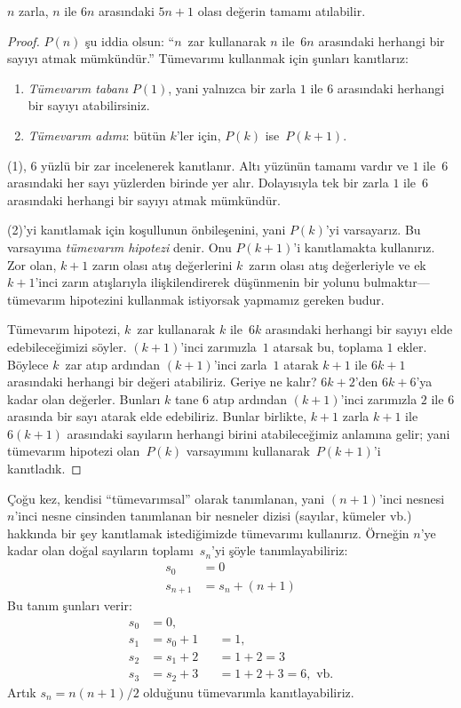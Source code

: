 \begin{thm}
  $n$ zarla, $n$ ile $6n$ arasındaki $5n+1$ olası değerin tamamı
  atılabilir.
\end{thm}

\begin{proof}
$P(n)$ şu iddia olsun: ``$n$~zar kullanarak $n$ ile~$6n$ arasındaki
herhangi bir sayıyı atmak mümkündür.'' Tümevarımı kullanmak için şunları
kanıtlarız:
\begin{enumerate}
\item \emph{Tümevarım tabanı} $P(1)$, yani yalnızca bir zarla $1$ ile
  $6$ arasındaki herhangi bir sayıyı atabilirsiniz.
\item \emph{Tümevarım adımı}: bütün $k$'ler için, $P(k)$ ise~$P(k+1)$.
\end{enumerate}

(1), $6$ yüzlü bir zar incelenerek kanıtlanır. Altı yüzünün tamamı
vardır ve $1$ ile~$6$ arasındaki her sayı yüzlerden birinde yer alır.
Dolayısıyla tek bir zarla $1$ ile~$6$ arasındaki herhangi bir sayıyı
atmak mümkündür.

(2)'yi kanıtlamak için koşullunun önbileşenini, yani $P(k)$'yi
varsayarız. Bu varsayıma \emph{tümevarım hipotezi} denir. Onu $P(k+1)$'i
kanıtlamakta kullanırız. Zor olan, $k+1$ zarın olası atış değerlerini
  $k$~zarın olası atış değerleriyle ve ek $k+1$'inci zarın atışlarıyla
ilişkilendirerek düşünmenin bir yolunu bulmaktır---tümevarım hipotezini
kullanmak istiyorsak yapmamız gereken budur.

Tümevarım hipotezi, $k$~zar kullanarak $k$ ile~$6k$ arasındaki herhangi
bir sayıyı elde edebileceğimizi söyler. $(k+1)$'inci zarımızla~$1$
atarsak bu, toplama $1$ ekler. Böylece $k$~zar atıp ardından
$(k+1)$'inci zarla~$1$ atarak $k+1$ ile $6k+1$ arasındaki herhangi bir
değeri atabiliriz. Geriye ne kalır? $6k+2$'den $6k+6$'ya kadar olan
değerler. Bunları $k$ tane $6$ atıp ardından $(k+1)$'inci zarımızla $2$
ile $6$ arasında bir sayı atarak elde edebiliriz. Bunlar birlikte,
$k+1$ zarla $k+1$ ile $6(k+1)$ arasındaki sayıların herhangi birini
atabileceğimiz anlamına gelir; yani tümevarım hipotezi olan~$P(k)$
varsayımını kullanarak~$P(k+1)$'i kanıtladık.
\end{proof}

Çoğu kez, kendisi ``tümevarımsal'' olarak tanımlanan, yani $(n+1)$'inci
nesnesi $n$'inci nesne cinsinden tanımlanan bir nesneler dizisi
(sayılar, kümeler vb.) hakkında bir şey kanıtlamak istediğimizde
tümevarımı kullanırız. Örneğin $n$'ye kadar olan doğal sayıların
toplamı~$s_n$'yi şöyle tanımlayabiliriz:
\begin{align*}
  s_0 & = 0\\
  s_{n+1} & = s_n + (n+1)
\end{align*}
Bu tanım şunları verir:
\begin{align*}
  s_0 & = 0,\\
  s_1 & = s_0 + 1 && = 1,\\
  s_2 & = s_1 + 2 && = 1 + 2 = 3\\
  s_3 & = s_2 + 3 && = 1 + 2 + 3 = 6, \text{ vb.}
\end{align*}
Artık $s_n = n(n+1)/2$ olduğunu tümevarımla kanıtlayabiliriz.

